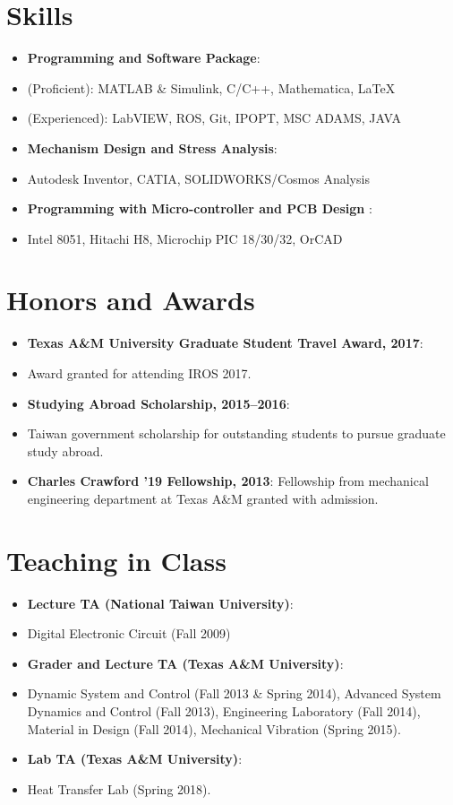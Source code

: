 \documentclass[letterpaper,11pt]{article}
\newcommand{\resumeItem}[2]{
  \item\small{
    \textbf{#1}{: #2 \vspace{-2pt}}
  }
}
\newcommand{\resumeNoItem}[1]{
  \item[]\small{
    {#1 \vspace{-2pt}}
  }
}
\newcommand{\resumeSubItem}[2]{\resumeItem{#1}{#2}\vspace{-4pt}}
\newcommand{\resumeSubHeadingListStart}{\begin{itemize}[leftmargin=*]}
\newcommand{\resumeSubHeadingListEnd}{\end{itemize}}
\begin{document}
\section{Skills}
   \resumeSubHeadingListStart
     \resumeSubItem{Programming and Software Package}
     {}
     \resumeNoItem
       {(Proficient): MATLAB \& Simulink, C/C++, Mathematica, \LaTeX} 
     \resumeNoItem
       {(Experienced):
              LabVIEW, ROS, Git, IPOPT, MSC ADAMS, JAVA}
   \resumeSubHeadingListEnd
 \resumeSubHeadingListStart
      \resumeSubItem{Mechanism Design and Stress Analysis}
     {}
     \resumeNoItem      
        {Autodesk Inventor, CATIA, SOLIDWORKS/Cosmos Analysis}
      \resumeSubItem{Programming with Micro-controller and PCB Design }
     {}
     \resumeNoItem      
        {Intel 8051, Hitachi H8, Microchip PIC 18/30/32, OrCAD}
    \resumeSubHeadingListEnd

\section{Honors and Awards}
  \resumeSubHeadingListStart
        \resumeSubItem{Texas A\&M University Graduate Student Travel Award, 2017}
             {}
        \resumeNoItem
        {Award granted for attending IROS 2017.}     
      \resumeSubItem{Studying Abroad Scholarship, 2015--2016}
     {}
     \resumeNoItem      
      {Taiwan government scholarship for outstanding students to pursue graduate study abroad.}
      \resumeSubItem{Charles Crawford '19 Fellowship, 2013}
		{Fellowship from mechanical engineering department at Texas A\&M granted with admission.}      
  \resumeSubHeadingListEnd
\section{Teaching in Class}
  \resumeSubHeadingListStart
      \resumeSubItem{Lecture TA (National Taiwan University)}
         {}
      \resumeNoItem 
      {Digital Electronic Circuit (Fall 2009)}  
      \resumeSubItem{Grader and Lecture TA (Texas A\&M University)}
         {}
      \resumeNoItem 
      {Dynamic System and Control (Fall 2013 \& Spring 2014), Advanced System Dynamics and Control (Fall 2013), Engineering Laboratory (Fall 2014), Material in Design (Fall 2014), Mechanical Vibration (Spring 2015).}
      \resumeSubItem{Lab TA (Texas A\&M University)}
         {}
      \resumeNoItem       
      {Heat Transfer Lab (Spring 2018).}      
  \resumeSubHeadingListEnd
\end{document}

